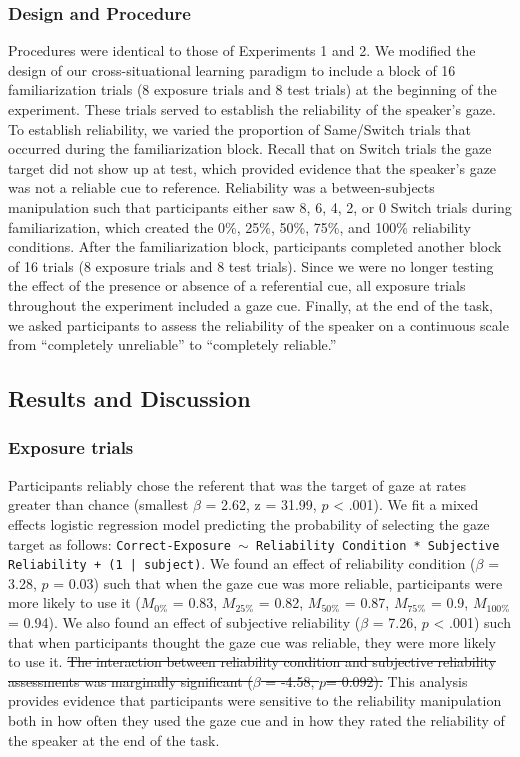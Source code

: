 \documentclass[authoryear, review]{elsarticle}
\providecommand{\DIFdeltex}[1]{{\protect\color{red}\sout{#1}}}                      %
\providecommand{\DIFdelbegin}{} %
\providecommand{\DIFdelend}{} %
\providecommand{\DIFdel}[1]{\texorpdfstring{\DIFdeltex{#1}}{}} %
\begin{document}
\subsubsection{Design and Procedure}\label{design-and-procedure-2}

Procedures were identical to those of Experiments 1 and 2. We modified
the design of our cross-situational learning paradigm to include a block
of 16 familiarization trials (8 exposure trials and 8 test trials) at
the beginning of the experiment. These trials served to establish the
reliability of the speaker's gaze. To establish reliability, we varied
the proportion of Same/Switch trials that occurred during the
familiarization block. Recall that on Switch trials the gaze target did
not show up at test, which provided evidence that the speaker's gaze was
not a reliable cue to reference. Reliability was a between-subjects
manipulation such that participants either saw 8, 6, 4, 2, or 0 Switch
trials during familiarization, which created the 0\%, 25\%, 50\%, 75\%,
and 100\% reliability conditions. After the familiarization block,
participants completed another block of 16 trials (8 exposure trials and
8 test trials). Since we were no longer testing the effect of the
presence or absence of a referential cue, all exposure trials throughout
the experiment included a gaze cue. Finally, at the end of the task, we
asked participants to assess the reliability of the speaker on a
continuous scale from ``completely unreliable'' to ``completely
reliable.''

\subsection{Results and Discussion}\label{results-and-discussion-2}

\subsubsection{Exposure trials}\label{exposure-trials-2}

Participants reliably chose the referent that was the target of gaze at
rates greater than chance (smallest \(\beta\) = 2.62, z = 31.99, \(p\)
\textless{} .001). We fit a mixed effects logistic regression model
predicting the probability of selecting the gaze target as follows:
\texttt{Correct-Exposure $\sim$ Reliability Condition * Subjective Reliability + (1 | subject)}.
We found an effect of reliability condition (\(\beta\) = 3.28, \(p\) =
0.03) such that when the gaze cue was more reliable, participants were
more likely to use it (\(M_{0\%}\) = 0.83, \(M_{25\%}\) = 0.82,
\(M_{50\%}\) = 0.87, \(M_{75\%}\) = 0.9, \(M_{100\%}\) = 0.94). We also
found an effect of subjective reliability (\(\beta\) = 7.26, \(p\)
\textless{} .001) such that when participants thought the gaze cue was
reliable, they were more likely to use it. \DIFdelbegin \DIFdel{The interaction between
reliability condition and subjective reliability assessments was
marginally significant (\(\beta\) = -4.58, \(p\)= 0.092). }\DIFdelend This analysis provides
evidence that participants were sensitive to the reliability
manipulation both in how often they used the gaze cue and in how they
rated the reliability of the speaker at the end of the task.
\end{document}
